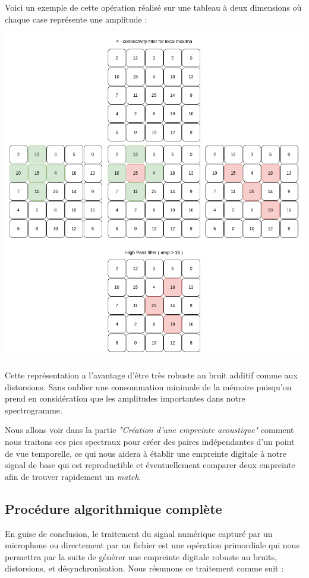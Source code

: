\documentclass[11pt, report, french]{scrreprt}
\begin{document}
\newpage
Voici un exemple de cette opération réalisé sur une tableau à deux dimensions où chaque case représente une amplitude :

\begin{center}
	\includegraphics[scale=0.6]{img/peaks_explain.png}
\end{center}

Cette représentation a l’avantage d’être très robuste au bruit additif comme aux distorsions. Sans oublier une consommation minimale de la mémoire puisqu'on prend en considération que les amplitudes importantes dans notre spectrogramme.\\\par
Nous allons voir dans la partie \textit{"Création d'une empreinte acoustique"} comment nous traitons ces pics spectraux pour créer des paires indépendantes d'un point de vue temporelle, ce qui nous aidera à établir une empreinte digitale à notre signal de base qui est reproductible et éventuellement comparer deux empreinte afin de trouver rapidement un \textit{match}.

\subsection{Procédure algorithmique complète}
En guise de conclusion, le traitement du signal numérique capturé par un microphone ou directement par un fichier est une opération primordiale qui nous permettra par la suite de générer une empreinte digitale robuste au bruits, distorsions, et désynchronisation. Nous résumons ce traitement comme suit :
\end{document}
